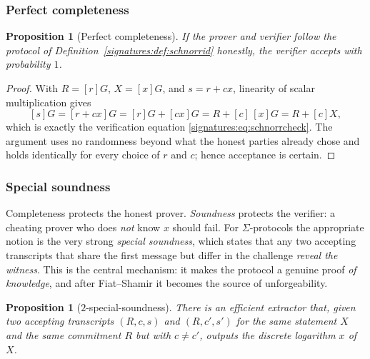 \documentclass[11pt,a4paper]{article}
\newtheorem{proposition}[theorem]{Proposition}
\theoremstyle{definition}
\theoremstyle{remark}
\begin{document}
\subsubsection{Perfect completeness}\label{signatures:subsubsec:completeness}

\begin{proposition}[Perfect completeness]\label{signatures:prop:completeness}
If the prover and verifier follow the protocol of Definition~\ref{signatures:def:schnorrid} honestly, the verifier accepts with probability \(1\).
\end{proposition}

\begin{proof}
With \(R = [r]G\), \(X = [x]G\), and \(s = r + cx\), linearity of scalar multiplication gives
\[
  [s]G = [r + cx]G = [r]G + [cx]G = R + [c]\,[x]G = R + [c]X,
\]
which is exactly the verification equation \eqref{signatures:eq:schnorrcheck}. The argument uses no randomness beyond what the honest parties already chose and holds identically for every choice of \(r\) and \(c\); hence acceptance is certain.
\end{proof}

\subsubsection{Special soundness}\label{signatures:subsubsec:soundness}

Completeness protects the honest prover. \emph{Soundness} protects the verifier: a cheating prover who does \emph{not} know \(x\) should fail. For \(\Sigma\)-protocols the appropriate notion is the very strong \emph{special soundness}, which states that any two accepting transcripts that share the first message but differ in the challenge \emph{reveal the witness}. This is the central mechanism: it makes the protocol a genuine proof \emph{of knowledge}, and after Fiat--Shamir it becomes the source of unforgeability.

\begin{proposition}[\(2\)-special-soundness]\label{signatures:prop:soundness}
There is an efficient \emph{extractor} that, given two accepting transcripts \((R, c, s)\) and \((R, c', s')\) for the same statement \(X\) and the same commitment \(R\) but with \(c \ne c'\), outputs the discrete logarithm \(x\) of \(X\).
\end{proposition}
\end{document}
